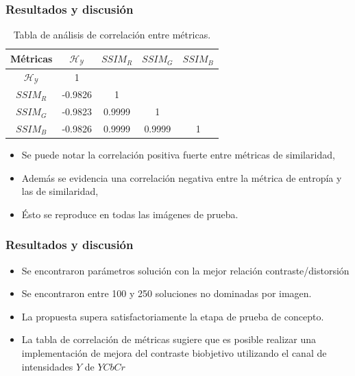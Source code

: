 \documentclass[usenames,dvipsnames]{beamer}
\begin{document}
\begin{frame}
\frametitle{Resultados y discusión} 
\begin{table}[H]
\setlength{\abovecaptionskip}{2pt plus 3pt minus 2pt} %
\caption[Parámetros de entrada para $MOPSO$]{Tabla de análisis de correlación entre métricas.}
\begin{center}
\begin{tabular}{||c | c c c c||} 
\hline
Métricas & $\mathscr{H_Y}$ & $SSIM_R$ & $SSIM_G$ & $SSIM_B$ \\ 
\hline
$\mathscr{H_Y}$ & 1 &   &   &  \\ 
\hline
$SSIM_R$ & -0.9826  & 1 &  &  \\ 
\hline
$SSIM_G$ & -0.9823 & 0.9999   & 1   &  \\ 
\hline
$SSIM_B$ & -0.9826 & 0.9999   & 0.9999   & 1 \\ 
\hline
\end{tabular}
\end{center}
\label{table:correlacion}
\end{table}

\begin{itemize}
\item Se puede notar la correlación positiva fuerte entre métricas de similaridad,
\item Además se evidencia una correlación negativa entre la métrica de entropía y las de similaridad,
\item Ésto se reproduce en todas las imágenes de prueba.
\end{itemize}

\end{frame}

\begin{frame}
\frametitle{Resultados y discusión} 
\begin{exampleblock}{}

\begin{itemize}
	\item Se encontraron parámetros solución con la mejor relación contraste/distorsión
	\item Se encontraron entre 100 y 250 soluciones no dominadas por imagen.
	\item La propuesta supera satisfactoriamente la etapa de prueba de concepto.
	\item La tabla de correlación de métricas sugiere que es posible realizar una implementación de mejora del contraste biobjetivo utilizando el canal de intensidades $Y$ de $YCbCr$
\end{itemize}

\end{exampleblock}

\end{frame}
\end{document}
